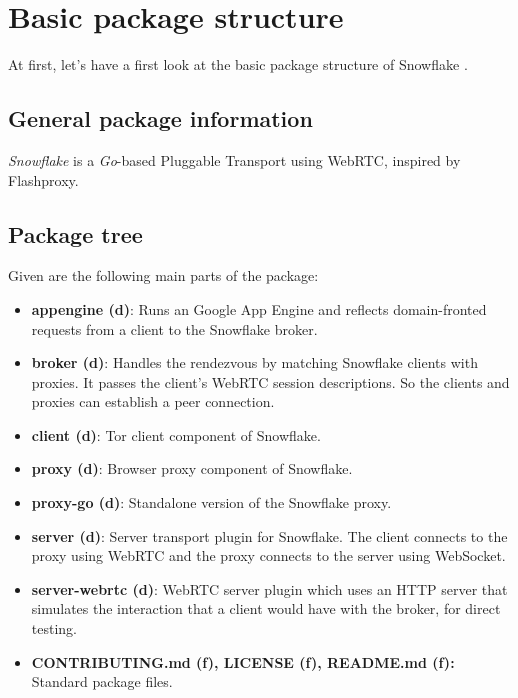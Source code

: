 \documentclass{amsart}
\theoremstyle{definition}
\theoremstyle{remark}
\numberwithin{equation}{section}
\begin{document}
\section{Basic package structure}
\label{s:basicpackagestructure}
At first, let's have a first look at the basic package structure of Snowflake \cite{SnowflakeGit}.
\subsection{General package information}
\label{ss:generalpackageinformation}
\textit{Snowflake} is a \textit{Go}-based Pluggable Transport using WebRTC, inspired by Flashproxy.
\subsection{Package tree}
\label{ss:packagetree}
Given are the following main parts of the package:
\begin{itemize}
    \item \textbf{appengine (d)}: Runs an Google App Engine and reflects domain-fronted requests from a client to the Snowflake broker.
    \item \textbf{broker (d)}: Handles the rendezvous by matching Snowflake clients with proxies. It passes the client's WebRTC session descriptions. So the clients and proxies can establish a peer connection.
    \item \textbf{client (d)}: Tor client component of Snowflake.
    \item \textbf{proxy (d)}: Browser proxy component of Snowflake.
    \item \textbf{proxy-go (d)}: Standalone version of the Snowflake proxy.
    \item \textbf{server (d)}: Server transport plugin for Snowflake. The client connects to the proxy using WebRTC and the proxy connects to the server using WebSocket.
    \item \textbf{server-webrtc (d)}: WebRTC server plugin which uses an HTTP server that simulates the interaction that a client would have with the broker, for direct testing.
    \item \textbf{CONTRIBUTING.md (f), LICENSE (f), README.md (f):} Standard package files.
\end{itemize}
\end{document}
